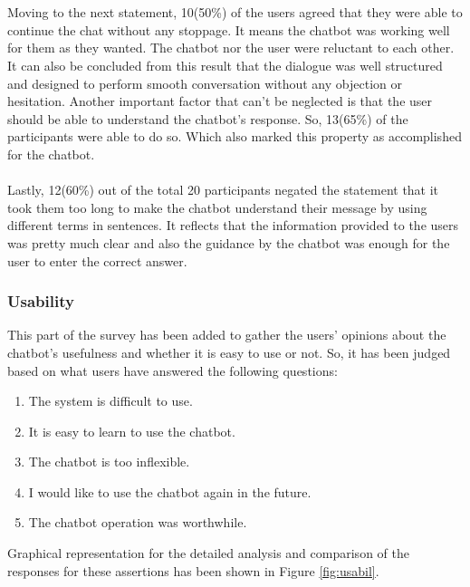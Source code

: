 \\~\\
Moving to the next statement, 10(50\%) of the users agreed that they were able to continue the chat without any stoppage. It means the chatbot was working well for them as they wanted. The chatbot nor the user were reluctant to each other. It can also be concluded from this result that the dialogue was well structured and designed to perform smooth conversation without any objection or hesitation. Another important factor that can't be neglected is that the user should be able to understand the chatbot's response. So, 13(65\%) of the participants were able to do so. Which also marked this property as accomplished for the chatbot.
\\~\\
Lastly, 12(60\%) out of the total 20 participants negated the statement that it took them too long to make the chatbot understand their message by using different terms in sentences. It reflects that the information provided to the users was pretty much clear and also the guidance by the chatbot was enough for the user to enter the correct answer.

\subsubsection*{Usability}
This part of the survey has been added to gather the users' opinions about the chatbot's usefulness and whether it is easy to use or not. So, it has been judged based on what users have answered the following questions:
\begin{enumerate}
    \item The system is difficult to use.
    \item It is easy to learn to use the chatbot.
    \item The chatbot is too inflexible.
    \item I would like to use the chatbot again in the future.
    \item The chatbot operation was worthwhile.
\end{enumerate}
Graphical representation for the detailed analysis and comparison of the responses for these assertions has been shown in Figure \ref{fig:usabil}.

